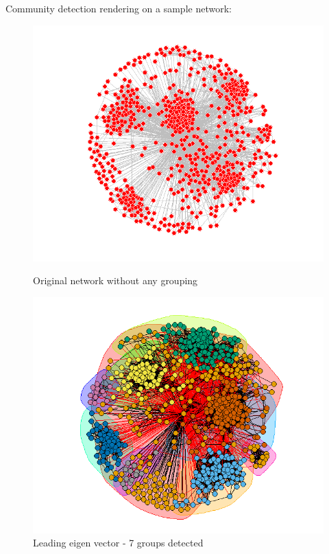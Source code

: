 \documentclass[11pt]{article}       %
\begin{document}
Community detection rendering on a sample network:
\begin{figure}[H]
\centering
\begin{minipage}[b]{0.47\linewidth}
\vspace{0pt}
\includegraphics[width=0.9\linewidth]{zNetwork.PNG}
\caption{Original network without any grouping}
\end{minipage}
\hspace{0.5cm}
\begin{minipage}[b]{0.47\linewidth}
\centering
\includegraphics[width=0.9\linewidth]{zNetworkLeadingEV.PNG}
\caption{Leading eigen vector - 7 groups detected}
\end{minipage}
\end{figure}
\captionsetup{type=table}
\end{document}
